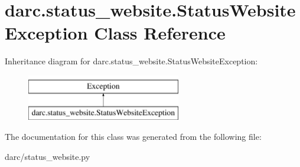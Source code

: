 \hypertarget{classdarc_1_1status__website_1_1_status_website_exception}{}\section{darc.\+status\+\_\+website.\+Status\+Website\+Exception Class Reference}
\label{classdarc_1_1status__website_1_1_status_website_exception}
Inheritance diagram for darc.\+status\+\_\+website.\+Status\+Website\+Exception\+:\begin{figure}[H]
\begin{center}
\leavevmode
\includegraphics[height=2.000000cm]{classdarc_1_1status__website_1_1_status_website_exception}
\end{center}
\end{figure}


The documentation for this class was generated from the following file\+:\begin{DoxyCompactItemize}
\item 
darc/status\+\_\+website.\+py\end{DoxyCompactItemize}
